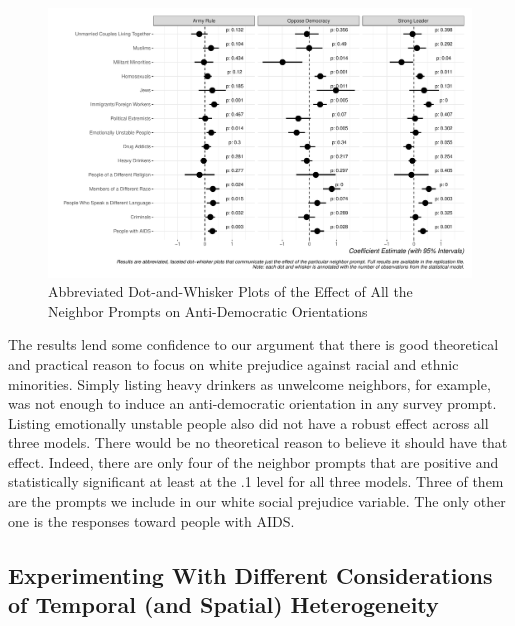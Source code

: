 \documentclass[11pt,]{article}
\begin{document}
\begin{figure}
\centering
\includegraphics{figs/neighbseps.pdf}
\caption{\label{fig:neighbseps}Abbreviated Dot-and-Whisker Plots of the
Effect of All the Neighbor Prompts on Anti-Democratic Orientations}
\end{figure}

The results lend some confidence to our argument that there is good
theoretical and practical reason to focus on white prejudice against
racial and ethnic minorities. Simply listing heavy drinkers as unwelcome
neighbors, for example, was not enough to induce an anti-democratic
orientation in any survey prompt. Listing emotionally unstable people
also did not have a robust effect across all three models. There would
be no theoretical reason to believe it should have that effect. Indeed,
there are only four of the neighbor prompts that are positive and
statistically significant at least at the .1 level for all three models.
Three of them are the prompts we include in our white social prejudice
variable. The only other one is the responses toward people with AIDS.

\hypertarget{experimenting-with-different-considerations-of-temporal-and-spatial-heterogeneity}{%
\subsection{Experimenting With Different Considerations of Temporal (and
Spatial)
Heterogeneity}\label{experimenting-with-different-considerations-of-temporal-and-spatial-heterogeneity}}
\end{document}
